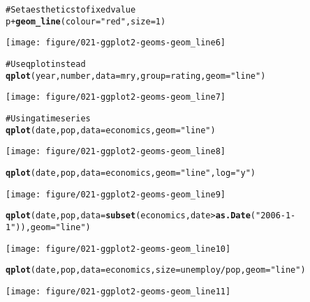 \documentclass[a4paper,titlepage]{tufte-handout}\usepackage{graphicx, color}
\makeatletter
\def\maxwidth{ %
  \ifdim\Gin@nat@width>\linewidth
    \linewidth
  \else
    \Gin@nat@width
  \fi
}
\newcommand{\hlfunctioncall}[1]{\textcolor[rgb]{0.501960784313725,0,0.329411764705882}{\textbf{#1}}}%
\newcommand{\hlstring}[1]{\textcolor[rgb]{0.6,0.6,1}{#1}}%
\newcommand{\hlcomment}[1]{\textcolor[rgb]{0.180392156862745,0.6,0.341176470588235}{#1}}%
\newenvironment{kframe}{%
 \def\at@end@of@kframe{}%
 \ifinner\ifhmode%
  \def\at@end@of@kframe{\end{minipage}}%
  \begin{minipage}{\columnwidth}%
 \fi\fi%
 \def\FrameCommand##1{\hskip\@totalleftmargin \hskip-\fboxsep
 \colorbox{shadecolor}{##1}\hskip-\fboxsep
     \hskip-\linewidth \hskip-\@totalleftmargin \hskip\columnwidth}%
 \MakeFramed {\advance\hsize-\width
   \@totalleftmargin\z@ \linewidth\hsize
   \@setminipage}}%
 {\par\unskip\endMakeFramed%
 \at@end@of@kframe}
\newenvironment{knitrout}{}{} %
\makeatother
\begin{document}
\begin{knitrout}
\begin{kframe}
\begin{alltt}
\hlcomment{# Set aesthetics to fixed value}
p + \hlfunctioncall{geom_line}(colour = \hlstring{"red"}, size = 1)
\end{alltt}
\end{kframe}
\texttt{[image: figure/021-ggplot2-geoms-geom\_line6]} 
\begin{kframe}\begin{alltt}

\hlcomment{# Use qplot instead}
\hlfunctioncall{qplot}(year, number, data=mry, group=rating, geom=\hlstring{"line"})
\end{alltt}
\end{kframe}
\texttt{[image: figure/021-ggplot2-geoms-geom\_line7]} 
\begin{kframe}\begin{alltt}

\hlcomment{# Using a time series}
\hlfunctioncall{qplot}(date, pop, data=economics, geom=\hlstring{"line"})
\end{alltt}
\end{kframe}
\texttt{[image: figure/021-ggplot2-geoms-geom\_line8]} 
\begin{kframe}\begin{alltt}
\hlfunctioncall{qplot}(date, pop, data=economics, geom=\hlstring{"line"}, log=\hlstring{"y"})
\end{alltt}
\end{kframe}
\texttt{[image: figure/021-ggplot2-geoms-geom\_line9]} 
\begin{kframe}\begin{alltt}
\hlfunctioncall{qplot}(date, pop, data=\hlfunctioncall{subset}(economics, date > \hlfunctioncall{as.Date}(\hlstring{"2006-1-1"})), geom=\hlstring{"line"})
\end{alltt}
\end{kframe}
\texttt{[image: figure/021-ggplot2-geoms-geom\_line10]} 
\begin{kframe}\begin{alltt}
\hlfunctioncall{qplot}(date, pop, data=economics, size=unemploy/pop, geom=\hlstring{"line"})
\end{alltt}
\end{kframe}
\texttt{[image: figure/021-ggplot2-geoms-geom\_line11]} 
\begin{kframe}\begin{alltt}


\end{alltt}
\end{kframe}
\end{knitrout}
\end{document}
